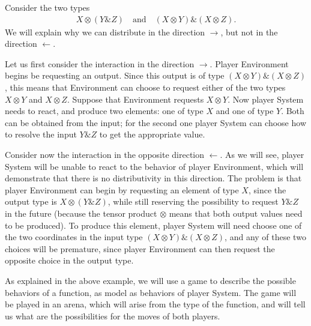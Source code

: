 \begin{example} 
    Consider the two types 
    \begin{align*}
        X \otimes (Y \& Z) 
        \quad \text{and} \quad
        (X \otimes Y) \& (X \otimes Z).
    \end{align*}
    We will explain why we can distribute in the direction $\rightarrow$, but not in the direction $\leftarrow$. 

    Let us first consider the interaction in the  direction $\rightarrow$. Player Environment begins be requesting an output. Since this output is of type $(X \otimes Y) \& (X \otimes Z)$, this means that Environment can choose to request either of the two types  $X \otimes Y$ and $X \otimes Z$. Suppose that Environment requests $X \otimes Y$. Now player System needs to react, and produce two elements: one of type $X$ and one of type $Y$. Both can be obtained from the input; for the second one player System can choose how to resolve the input $Y \& Z$ to get the appropriate value. 

    Consider now the interaction in the opposite direction $\leftarrow$. As we will see, player System will be unable to react to the behavior of player Environment, which will demonstrate that there is no distributivity in this direction. The problem is that player Environment can begin by requesting an element of type $X$, since the output type is $X \otimes (Y \& Z)$, while still reserving the possibility to request $Y \& Z$ in the future (because the tensor product $\otimes$ means that both output values need to be produced). To produce this element, player System will need  choose one of the two coordinates in the input type $(X \otimes Y) \& (X \otimes Z)$, and any of these two  choices will be premature, since player Environment can then request the opposite choice in the output type.  \exampleend
\end{example}

As explained in the above example, we will use a game to describe the possible behaviors of a function, as model as behaviors of player System. The game will be played in an arena, which will arise from the type of the function, and will tell us what are the possibilities for the moves of both players. 

